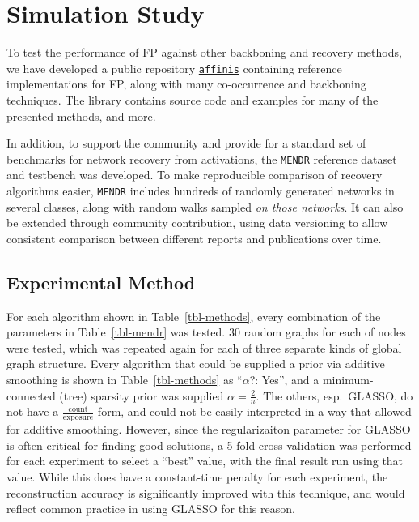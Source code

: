 \documentclass[%
	12pt,
		oneside,
		letterpaper
]{book}
\begin{document}
\section{Simulation Study}\label{sec-FP-experiments}

To test the performance of FP against other backboning and recovery methods, we have developed a public repository \href{https://github.com/rtbs-dev/affinis}{\texttt{affinis}} containing reference implementations for FP, along with many co-occurrence and backboning techniques.
The library contains source code and examples for many of the presented methods, and more.

In addition, to support the community and provide for a standard set of benchmarks for network recovery from activations, the \href{https://github.com/rtbs-dev/mendr}{\texttt{MENDR}} reference dataset and testbench was developed.
To make reproducible comparison of recovery algorithms easier, \texttt{MENDR} includes hundreds of randomly generated networks in several classes, along with random walks sampled \emph{on those networks}.
It can also be extended through community contribution, using data versioning to allow consistent comparison between different reports and publications over time.

\subsection{Experimental Method}\label{experimental-method}

For each algorithm shown in Table~\ref{tbl-methods}, every combination of the parameters in Table~\ref{tbl-mendr} was tested. 30 random graphs for each of nodes were tested, which was repeated again for each of three separate kinds of global graph structure.
Every algorithm that could be supplied a prior via additive smoothing is shown in Table~\ref{tbl-methods} as ``\(\alpha\)?: Yes'', and a minimum-connected (tree) sparsity prior was supplied \(\alpha=\tfrac{2}{n}\).
The others, esp.~GLASSO, do not have a \(\tfrac{\text{count}}{\text{exposure}}\) form, and could not be easily interpreted in a way that allowed for additive smoothing.
However, since the regularizaiton parameter for GLASSO is often critical for finding good solutions, a 5-fold cross validation was performed for each experiment to select a ``best'' value, with the final result run using that value.
While this does have a constant-time penalty for each experiment, the reconstruction accuracy is significantly improved with this technique, and would reflect common practice in using GLASSO for this reason.
\end{document}
